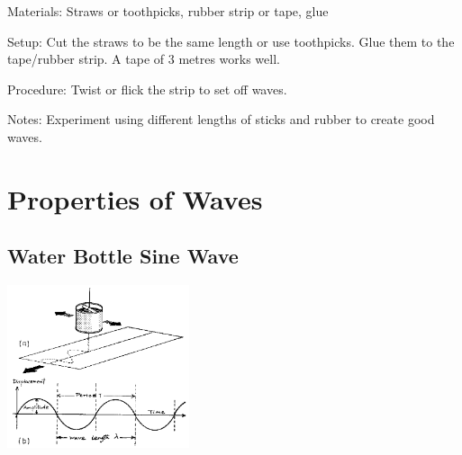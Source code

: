 \begin{multicols}{2}
\begin{description*}
\item[Materials:]{Straws or toothpicks, rubber strip or tape, glue}
\item[Setup:]{Cut the straws to be the same length or use toothpicks. Glue them to the tape/rubber strip. A tape of 3 metres works well.}
\item[Procedure:]{Twist or flick the strip to set off waves.}
\item[Notes:]{Experiment using different lengths of sticks and rubber to create good waves.}
\end{description*}


\section*{Properties of Waves}


\subsection{Water Bottle Sine Wave}

\begin{center}
\includegraphics[width=0.4\textwidth]{./img/source/sine-wave.png}
\end{center}


\end{multicols}
